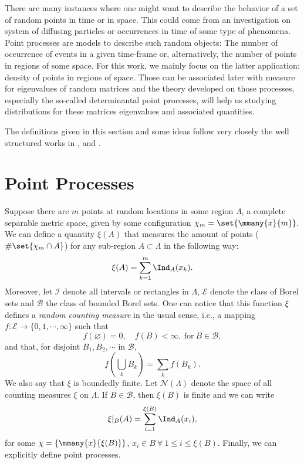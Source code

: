 There are many instances where one might want to describe the behavior of a set of random points in time or in space. This could come from an investigation on system of diffusing particles or occurrences in time of some type of phenomena. Point processes are models to describe such random objects: The number of occurrence of events in a given time-frame or, alternatively, the number of points in regions of some space. For this work, we mainly focus on the latter application: density of points in regions of space. Those can be associated later with measure for eigenvalues of random matrices and the theory developed on those processes, especially the so-called determinantal point processes, will help us studying distributions for these matrices eigenvalues and associated quantities.

The definitions given in this section and some ideas follow very closely the well structured works in ,  and .

\section{Point Processes}

Suppose there are $m$ points at random locations in some region $\Lambda$, a complete separable metric space, given by some configuration $\chi_m = \set{\mmany{x}{m}}$. We can define a quantity $\xi(A)$ that measures the amount of points ($\#\set{\chi_m \cap A}$) for any sub-region $A \subset \Lambda$ in the following way:
\begin{equation}
	\xi(A) = \sum_{k=1}^{m} \Ind_{A}(x_k).
\end{equation}
Moreover, let $\mathcal{I}$ denote all intervals or rectangles in $\Lambda$, $\mathcal{E}$ denote the class of Borel sets and $\mathcal{B}$ the class of bounded Borel sets. One can notice that this function $\xi$ defines a \textit{random counting measure} in the usual sense, i.e., a mapping $f: \mathcal{E} \rightarrow \{0,1,\cdots, \infty\}$ such that 
\begin{equation}
	f(\varnothing) = 0, \quad f(B) < \infty, \ \text{for} \ B \in \mathcal{B},
\end{equation} 
and that, for disjoint $B_1, B_2, \cdots$ in $\mathcal{B},$
\begin{equation}
	f\left( \bigcup_k B_k \right) = \sum_k f(B_k).
\end{equation} 
We also say that $\xi$ is boundedly finite. Let $\mathcal{N}(\Lambda)$ denote the space of all counting measures $\xi$ on $\Lambda$. If $B \in \mathcal{B}$, then $\xi(B)$ is finite and we can write
\begin{equation}
	\xi|_B(A) = \sum_{i=1}^{\xi(B)} \Ind_{A}{(x_i)},
\end{equation}
for some $\chi = \{\mmany{x}{{\xi(B)}}\}$, $x_i \in B \ \forall \ 1 \leq i \leq \xi(B)$. Finally, we can explicitly define point processes.

